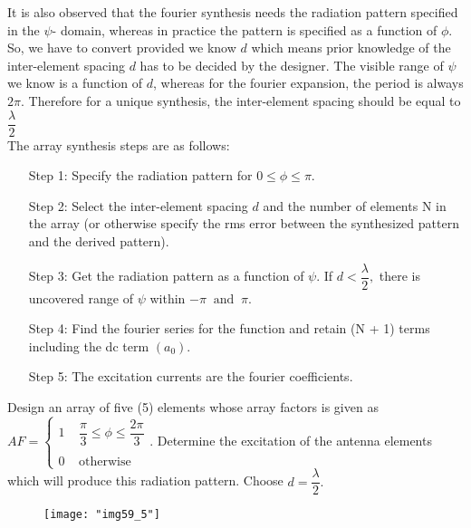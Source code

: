 	It is also observed that the fourier synthesis needs the radiation pattern specified in the $\psi$- domain, whereas in practice the pattern is specified as a function of $\phi$. So, we have to convert provided we know $d$ which means prior knowledge of the inter-element spacing $d$ has to be decided by the designer. The visible range of $\psi$ we know is a function of $d$, whereas for the fourier expansion, the period is always $2\pi$. Therefore for a unique synthesis, the inter-element spacing should be equal to $\dfrac{\lambda}{2}$\\
	The array synthesis steps are as follows:
	\begin{enumerate}
		\item[Step 1:] Specify the radiation pattern for $0 \leq \phi \leq \pi$.
		
		\item[Step 2:] Select the inter-element spacing $d$ and the number of elements N in the array (or otherwise specify the rms error between the synthesized pattern and the derived pattern).
		
		\item[Step 3:] Get the radiation pattern as a function of $\psi$. If $d < \dfrac{\lambda}{2},$ there is uncovered range of $\psi$ within $-\pi \; \; \text{and} \; \; \pi$.
		
		\item[Step 4:] Find the fourier series for the function and retain (N + 1) terms including the dc term $(a_0)$.
		
		\item[Step 5:] The excitation currents are the fourier coefficients.
	\end{enumerate}
	\begin{exmp}
			Design an array of five (5) elements whose array factors is given as\\
		$ AF = \begin{cases}
		1 \; \; \; \; \dfrac{\pi}{3} \leq \phi \leq \dfrac{2\pi}{3}\\
		\\
		0 \; \; \; \; \text{otherwise}
		\end{cases}$.
			Determine the excitation of the antenna elements which will produce this radiation pattern. Choose $d = \dfrac{\lambda}{2}.$
		\begin{figure}[H]
			\vspace{-10pt}
			\centering
			\texttt{[image: "img59\_5"]}
			\label{fig:fig-5}
		\end{figure}
	\end{exmp}

